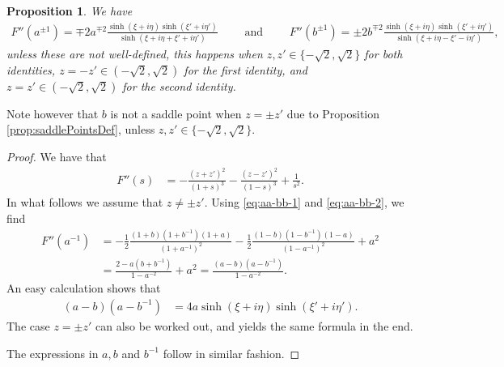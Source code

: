 \documentclass[%
 jmp,
cp,  %
 amsmath,amsthm,amssymb,%
 reprint,%
onecolumn]{revtex4-2}
\newtheorem{proposition}[theorem]{Proposition}
\begin{document}
\begin{proposition} \label{prop:F''a-1}
We have
\begin{align}
F''(a^{\pm 1}) = \mp 2 a^{\mp 2} \frac{\sinh(\xi+i\eta) \sinh(\xi'+i\eta')}{\sinh(\xi+i\eta+\xi'+i\eta')}
\qquad\text{ and }\qquad
F''(b^{\pm 1}) = \pm 2 b^{\mp 2} \frac{\sinh(\xi+i\eta) \sinh(\xi'+i\eta')}{\sinh(\xi+i\eta-\xi'-i\eta')},
\end{align}
unless these are not well-defined, this happens when $z, z'\in\{-\sqrt 2, \sqrt 2\}$ for both identities,  $z=-z'\in (-\sqrt 2, \sqrt 2)$ for the first identity, and $z=z'\in (-\sqrt 2, \sqrt 2)$ for the second identity. 
\end{proposition}

Note however that $b$ is not a saddle point when $z=\pm z'$ due to Proposition \ref{prop:saddlePointsDef}, unless $z, z'\in\{-\sqrt 2, \sqrt 2\}$.

\begin{proof}
We have that
\begin{align}
F''(s) &= - \frac{(z+z')^2}{(1+s)^3} - \frac{(z-z')^2}{(1-s)^3} + \frac{1}{s^2}. 
\end{align}
In what follows we assume that $z\neq\pm z'$. Using \eqref{eq:aa-bb-1} and \eqref{eq:aa-bb-2}, we find
\begin{align} \nonumber
F''(a^{-1}) &= - \frac{1}{2} \frac{(1+b)(1+b^{-1})(1+a)}{(1+a^{-1})^2} - \frac{1}{2} \frac{(1-b)(1-b^{-1})(1-a)}{(1-a^{-1})^2} + a^2\\
&= \frac{2-a (b+b^{-1})}{1-a^{-2}} + a^2
= \frac{(a - b)(a - b^{-1})}{1-a^{-2}}. 
\end{align}
An easy calculation shows that
\begin{align}
(a-b)(a-b^{-1}) &= 4 a \sinh(\xi+i\eta) \sinh(\xi'+i\eta').
\end{align}
The case $z=\pm z'$ can also be worked out, and yields the same formula in the end.

The expressions in $a, b$ and $b^{-1}$ follow in similar fashion. 
\end{proof}
\end{document}
